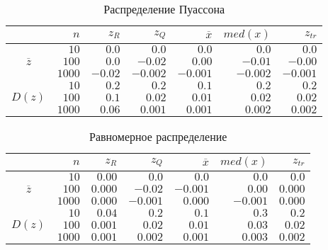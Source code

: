 \documentclass[zuev_report2.tex]{subfiles}
\begin{document}
\begin{table}[H]
\centering
\caption{Распределение Пуассона}
\begin{tabular}{c*6r}
\toprule
{} &         
$n$ & 
\centering $z_R$ & 
\centering $z_Q$ &
\centering $\overline{x}$& 
\centering $med(x)$ &
\centering $z_{tr}$ \tabularnewline
\midrule
\multirow{3}{*}{$\overline{z}$}
& $10$    & $ 0.0$  & $ 0.0$  & $ 0.0$  & $ 0.0$  & $ 0.0$ \\
& $100$   & $ 0.0$  & $-0.02$  & $ 0.00$  & $-0.01$  & $-0.00$ \\
& $1000$  & $-0.02$  & $-0.002$  & $-0.001$  & $-0.002$  & $-0.001$ \\
\midrule
\multirow{3}{*}{$D(z)$}
& $10$    & $0.2$  & $0.2$  & $0.1$  & $0.2$  & $0.2$ \\
& $100$   & $0.1$  & $0.02$  & $0.01$  & $0.02$  & $0.02$ \\
& $1000$  & $0.06$  & $0.001$  & $0.001$  & $0.002$  & $0.002$ \\
\bottomrule
\end{tabular}
\label{table:poisson}
\end{table}

\begin{table}[H]
\centering
\caption{Равномерное распределение}
\begin{tabular}{c*6r}
\toprule
{} &         
$n$ & 
\centering $z_R$ & 
\centering $z_Q$ &
\centering $\overline{x}$& 
\centering $med(x)$ &
\centering $z_{tr}$ \tabularnewline
\midrule
\multirow{3}{*}{$\overline{z}$}
& $10$    & $ 0.00$  & $ 0.0$  & $ 0.0$  & $ 0.0$  & $ 0.0$ \\
& $100$   & $ 0.000$  & $-0.02$  & $-0.001$  & $0.00$  & $ 0.000$ \\
& $1000$  & $ 0.000$  & $-0.001$  & $ 0.000$  & $-0.001$  & $ 0.000$ \\
\midrule
\multirow{3}{*}{$D(z)$}
& $10$    & $0.04$  & $0.2$  & $0.1$  & $0.3$  & $0.2$ \\
& $100$   & $0.001$  & $0.02$  & $0.01$  & $0.03$  & $0.02$ \\
& $1000$  & $0.001$  & $0.002$  & $0.001$  & $0.003$  & $0.002$ \\
\bottomrule
\end{tabular}
\label{table:uniform}
\end{table}
\newpage
\end{document}
